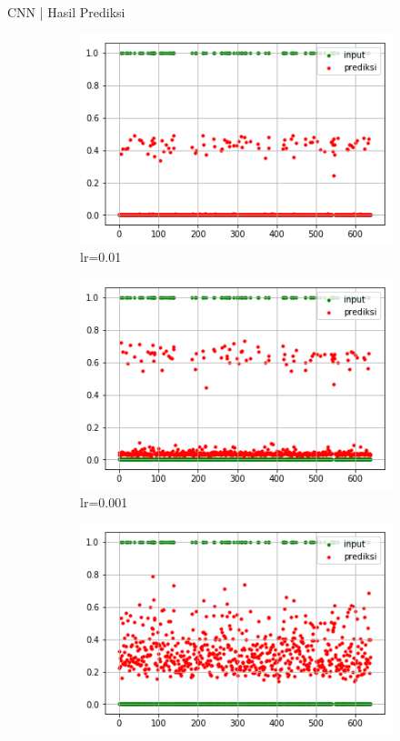 \documentclass[t]{beamer}
\begin{document}
\begin{frame}{CNN | Hasil Prediksi}
\begin{figure}[H]
\begin{subfigure}[b]{.23\linewidth}
        \includegraphics[width=\textwidth]{public/assets/img/cnn_svchosta_test_pred001.png}
        \caption{lr=0.01}
    \end{subfigure}
    \begin{subfigure}[b]{.23\linewidth}
        \includegraphics[width=\textwidth]{public/assets/img/cnn_svchosta_test_pred0001.png}
        \caption{lr=0.001}
    \end{subfigure}
    \begin{subfigure}[b]{.23\linewidth}
        \includegraphics[width=\textwidth]{public/assets/img/cnn_svchosta_test_pred00001.png}

\end{subfigure}
\end{figure}
\end{frame}
\end{document}
